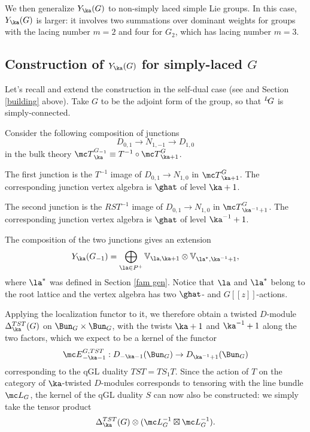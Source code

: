 \documentclass[11pt,reqno]{amsart}
\theoremstyle{plain}
\numberwithin{equation}{section}
\def\neg{\negthinspace}
\def\LG{{}^L\neg G}
\theoremstyle{definition}
\begin{document}
We then generalize $Y_\ka(G)$ to non-simply laced simple Lie
groups. In this case, $Y_\ka(G)$ is larger: it involves two
summations over dominant weights for groups with the lacing number
$m=2$ and four for $G_2$, which has lacing number $m=3$.

\subsection{Construction of $Y_\ka(G)$ for simply-laced
  $G$}    \label{YkaG}

Let's recall and extend the construction in the self-dual case (see
\cite{Ga1,CG} and Section \ref{building} above). Take $G$ to be the
adjoint form of the group, so that $\LG$ is simply-connected.

Consider the following composition of junctions
\begin{equation}    \label{E8}
D_{0,1} \to N_{1,-1} \to D_{1,0}
\end{equation}
in the bulk theory ${\mc T}^{G_{-1}}_{\ka} \equiv T^{-1} \circ {\mc
  T}^{G}_{\ka+1}$.

The first junction is the $T^{-1}$ image of $D_{0,1} \to N_{1,0}$ in
${\mc T}^{G}_{\ka+1}$.  The corresponding junction vertex algebra is
$\ghat$ of level $\ka+1$.

The second junction is the $RST^{-1}$ image of $D_{0,1} \to N_{1,0}$
in ${\mc T}^{G}_{\ka^{-1}+1}$. The corresponding junction vertex
algebra is $\ghat$ of level $\ka^{-1}+1$.

The composition of the two junctions gives an extension 
$$
Y_\ka(G_{-1}) = \bigoplus_{\la \in P^+} {\mathbb V}_{\la,\ka+1}
\otimes {\mathbb V}_{\la^*,\ka^{-1}+1},
$$
where $\la^*$ was defined in Section \ref{fam gen}. Notice that $\la$
and $\la^*$ belong to the root lattice and the vertex algebra has two
$\ghat$- and $G[[z]]$-actions.
 
Applying the localization functor to it, we therefore obtain a twisted
$D$-module $\Delta^{TST}_\ka(G)$ on $\Bun_G \times \Bun_G$, with the
twists $\ka+1$ and $\ka^{-1}+1$ along the two factors, which we expect
to be a kernel of the functor
$$
{\mc E}^{G,TST}_{-\ka-1}: D_{-\ka-1}(\Bun_G) \to
D_{\ka^{-1}+1}(\Bun_G)
$$
corresponding to the qGL duality $TST=TS_1T$. Since the action of $T$
on the category of $\ka$-twisted $D$-modules corresponds to tensoring
with the line bundle ${\mc L}_G$, the kernel of the qGL duality $S$
can now also be constructed: we simply take the tensor product
$$
\Delta^{TST}_\ka(G) \otimes ({\mc L}_G^{-1} \boxtimes {\mc
  L}_G^{-1}).
$$
\end{document}
